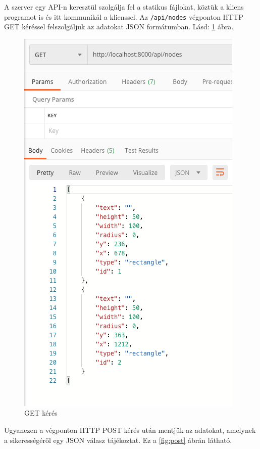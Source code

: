 A szerver egy API-n keresztül szolgálja fel a statikus fájlokat, köztük a kliens programot is és itt kommunikál a klienssel. Az \texttt{/api/nodes} végponton HTTP GET kéréssel felszolgáljuk az adatokat JSON formátumban. Lásd: \ref{fig:get} ábra.

\begin{figure}[h]
\centering
\includegraphics[scale=0.9]{images/get.png}
\caption{GET kérés}
\label{fig:get}
\end{figure}

Ugyanezen a végponton HTTP POST kérés után mentjük az adatokat, amelynek a sikerességéről egy JSON válasz tájékoztat. Ez a \ref{fig:post} ábrán látható.

